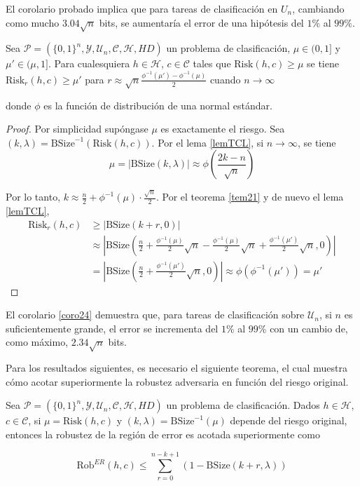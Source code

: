 El corolario probado implica que para tareas de clasificación en \(U_n\), cambiando como mucho \(3.04\sqrt{n}\)  bits, se aumentaría el error de una hipótesis del \(1\%\) al \(99\%\).

\begin{corolario} \label{coro24}
Sea $\mathcal{P}=(\{0,1\}^n,\mathcal{Y},\mathcal{U}_n,\mathcal{C},\mathcal{H},HD)$ un problema de clasificación, $\mu \in (0,1]$ y $\mu' \in (\mu,1]$. Para cualesquiera $h \in \mathcal{H}$, $c \in \mathcal{C}$ tales que $\text{Risk}(h,c) \geq \mu$ se tiene $\text{Risk}_r(h,c) \geq \mu'$ para $r \approx \sqrt{n}\frac{\phi^{-1}(\mu')-\phi^{-1}(\mu)}{2}$ cuando $n \to \infty$

donde $\phi$ es la función de distribución de una normal estándar.
\end{corolario}

\begin{proof}
Por simplicidad supóngase $\mu$ es exactamente el riesgo. Sea $(k,\lambda) = \text{BSize}^{-1}(\text{Risk}(h,c))$. Por el lema \ref{lemTCL}, si $n \to \infty$, se tiene 
$$\mu=|\text{BSize}(k,\lambda)| \approx \phi \left(\frac{2k-n}{\sqrt{n}}\right)$$

Por lo tanto, $k \approx \frac{n}{2}+\phi^{-1}(\mu)\cdot \frac{\sqrt{n}}{2}$. Por el teorema \ref{tem21} y de nuevo el lema \ref{lemTCL},
\begin{align*}
\text{Risk}_r(h,c) &\geq |\text{BSize}(k+r,0)| \\
&\approx \left| \text{BSize} \left( \frac{n}{2} + \frac{\phi^{-1}(\mu)}{2}\sqrt{n}-\frac{\phi^{-1}(\mu)}{2}\sqrt{n} + \frac{\phi^{-1}(\mu')}{2}\sqrt{n},0 \right) \right| \\
&= \left| \text{BSize} \left( \frac{n}{2}+\frac{\phi^{-1}(\mu')}{2}\sqrt{n},0 \right) \right| \approx \phi(\phi^{-1}(\mu')) = \mu'
\end{align*}
\end{proof}

El corolario \ref{coro24} demuestra que, para tareas de clasificación sobre $\mathcal{U}_n$, si $n$ es suficientemente grande, el error se incrementa del $1\%$ al $99\%$ con un cambio de, como máximo, $2.34\sqrt{n}$ bits.

Para los resultados siguientes, es necesario el siguiente teorema, el cual muestra cómo acotar superiormente la robustez adversaria en función del riesgo original.


\begin{teorema} \label{teom22}
Sea $\mathcal{P}=(\{0,1\}^n,\mathcal{Y},\mathcal{U}_n,\mathcal{C},\mathcal{H},HD)$ un problema de clasificación. Dados $h \in \mathcal{H}$,$c \in \mathcal{C}$, si $\mu=\text{Risk}(h,c)$ y $(k,\lambda)=\text{BSize}^{-1}(\mu)$ depende del riesgo original, entonces la robustez de la región de error es acotada superiormente como

$$\text{Rob}^{ER}(h,c) \leq \sum_{r=0}^{n-k+1}(1-\text{BSize}(k+r,\lambda))$$
\end{teorema}

